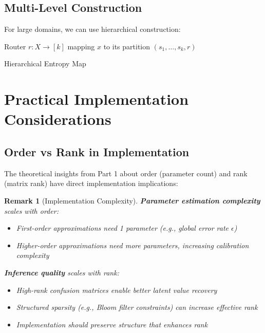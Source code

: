 \documentclass[11pt,final,hidelinks]{article}
\newtheorem{remark}[theorem]{Remark}
\begin{document}
\subsection{Multi-Level Construction}

For large domains, we can use hierarchical construction:

\begin{algorithm}[H]
\SetAlgoLined
{}
Router $r: X \to [k]$ mapping $x$ to its partition\;
\Return $(s_1, \ldots, s_k, r)$\;
\caption{Hierarchical Entropy Map}
\end{algorithm}

\section{Practical Implementation Considerations}

\subsection{Order vs Rank in Implementation}

The theoretical insights from Part 1 about order (parameter count) and rank (matrix rank) have direct implementation implications:

\begin{remark}[Implementation Complexity]
\textbf{Parameter estimation complexity} scales with order:
\begin{itemize}
    \item First-order approximations need 1 parameter (e.g., global error rate $\epsilon$)
    \item Higher-order approximations need more parameters, increasing calibration complexity
\end{itemize}

\textbf{Inference quality} scales with rank:
\begin{itemize}
    \item High-rank confusion matrices enable better latent value recovery
    \item Structured sparsity (e.g., Bloom filter constraints) can increase effective rank
    \item Implementation should preserve structure that enhances rank
\end{itemize}
\end{remark}
\end{document}
